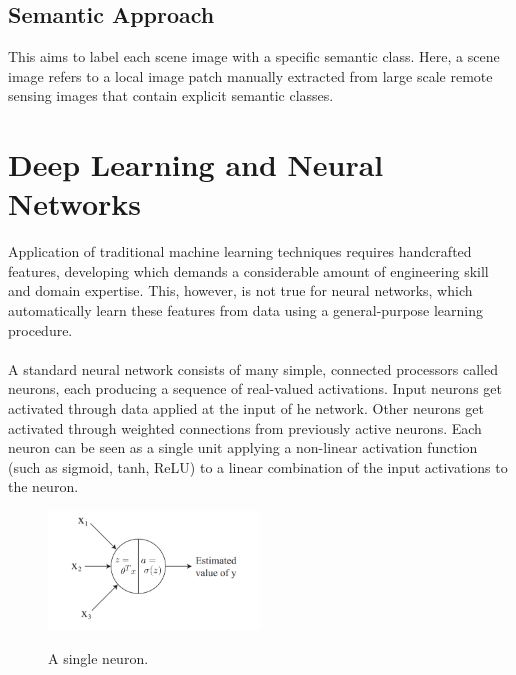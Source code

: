 \documentclass[12pt, a4paper]{report}
\begin{document}
\subsection{Semantic Approach}
This aims to label each scene image with a specific semantic class. Here, a scene image refers to a local image patch manually extracted from large scale remote sensing images that contain explicit semantic classes.\cite{eyesky}

\newpage
\section{Deep Learning and Neural Networks}
Application of traditional machine learning techniques requires handcrafted features, developing which demands a considerable amount of engineering skill and domain expertise. This, however, is not true for neural networks, which automatically learn these features from data using a general-purpose learning procedure.\cite{eyesky, cs231n} 
\paragraph{}
A standard neural network consists of many simple, connected processors called neurons, each producing a sequence of real-valued activations. Input neurons get activated through data applied at the input of he network. Other neurons get activated through weighted connections from previously active neurons. \cite{schmidhuber2015deep} Each neuron can be seen as a single unit applying a non-linear activation function (such as sigmoid, tanh, ReLU) to a linear combination of the input activations to the neuron.\cite{cs229}
\begin{figure}[h]
\centering
\includegraphics[width=0.5\textwidth]{nn1.png}
\caption{A single neuron.}\cite{cs229}
\end{figure}
\end{document}

